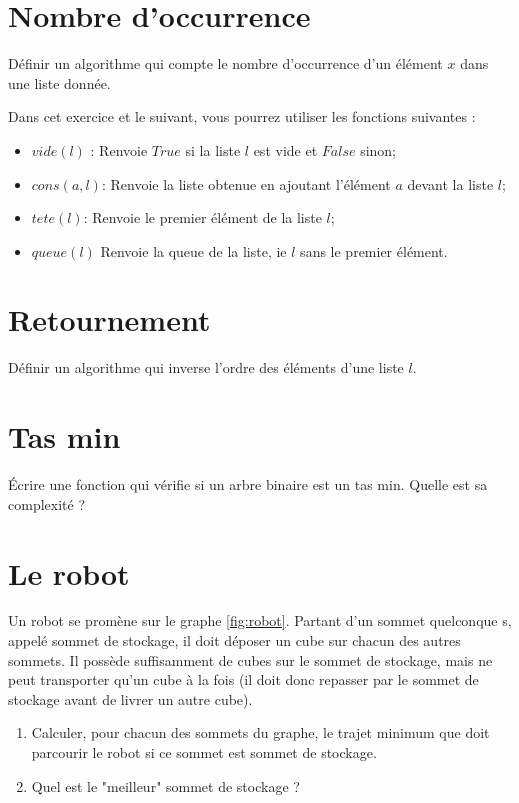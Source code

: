\documentclass{article}[12pt]
\begin{document}
\section{Nombre d'occurrence}
Définir un algorithme qui compte le nombre d'occurrence d'un élément $x$ dans une liste donnée.

Dans cet exercice et le suivant, vous pourrez utiliser les fonctions suivantes : 
\begin{itemize}
    \item $vide(l)$ : Renvoie $True$ si la liste $l$ est vide et $False$ sinon;
    \item $cons(a,l)$: Renvoie la liste obtenue en ajoutant l'élément $a$ devant la liste $l$;
    \item $tete(l)$: Renvoie le premier élément de la liste $l$;
    \item $queue(l)$ Renvoie la queue de la liste, ie $l$ sans le premier élément.
\end{itemize}


\section{Retournement}
Définir un algorithme qui inverse l'ordre des éléments d'une liste $l$.

\section{Tas min}
Écrire une fonction qui vérifie si un arbre binaire est un tas min. Quelle est sa complexité ?


\section{Le robot}
Un robot se promène sur le graphe \ref{fig:robot}. Partant d’un sommet quelconque s, appelé sommet de stockage, il doit déposer un cube sur chacun des autres sommets. Il possède suffisamment de cubes sur le sommet de stockage, mais ne peut transporter qu'un cube à la fois (il doit donc repasser par le sommet de stockage avant de livrer un autre cube).
\begin{enumerate}
    \item Calculer, pour chacun des sommets du graphe, le trajet minimum que doit parcourir le robot si ce sommet est sommet de stockage.
    \item Quel est le "meilleur" sommet de stockage ?
\end{enumerate}
\end{document}
